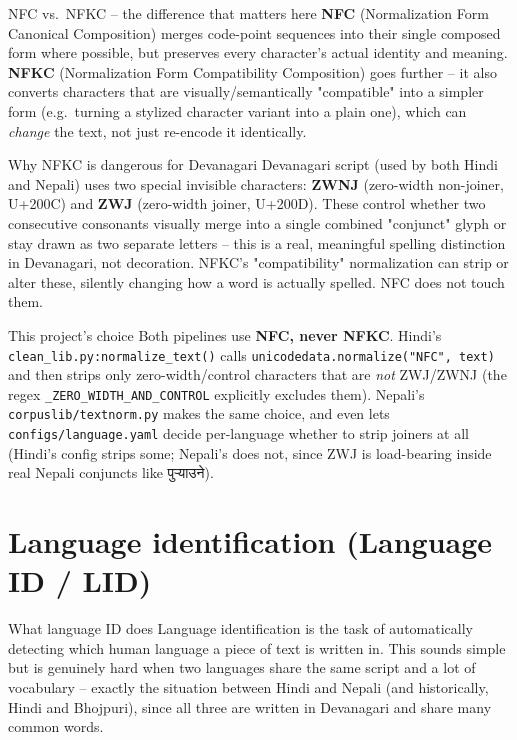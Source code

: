 \documentclass[11pt]{report}
\newcommand{\dn}[1]{{\devanagarifont #1}}
\begin{document}
\begin{concept}{NFC vs.\ NFKC -- the difference that matters here}
\textbf{NFC} (Normalization Form Canonical Composition) merges
code-point sequences into their single composed form where possible, but
preserves every character's actual identity and meaning.
\textbf{NFKC} (Normalization Form Compatibility Composition) goes
further -- it also converts characters that are visually/semantically
"compatible" into a simpler form (e.g.\ turning a stylized character
variant into a plain one), which can \textit{change} the text, not just
re-encode it identically.
\end{concept}

\begin{example}{Why NFKC is dangerous for Devanagari}
Devanagari script (used by both Hindi and Nepali) uses two special
invisible characters: \textbf{ZWNJ} (zero-width non-joiner, U+200C) and
\textbf{ZWJ} (zero-width joiner, U+200D). These control whether two
consecutive consonants visually merge into a single combined "conjunct"
glyph or stay drawn as two separate letters -- this is a real,
meaningful spelling distinction in Devanagari, not decoration. NFKC's
"compatibility" normalization can strip or alter these, silently changing
how a word is actually spelled. NFC does not touch them.
\end{example}

\begin{implementation}{This project's choice}
Both pipelines use \textbf{NFC, never NFKC}. Hindi's
\texttt{clean\_lib.py:normalize\_text()} calls
\texttt{unicodedata.normalize("NFC", text)} and then strips only
zero-width/control characters that are \textit{not} ZWJ/ZWNJ (the regex
\texttt{\_ZERO\_WIDTH\_AND\_CONTROL} explicitly excludes them). Nepali's
\texttt{corpuslib/textnorm.py} makes the same choice, and even lets
\texttt{configs/language.yaml} decide per-language whether to strip
joiners at all (Hindi's config strips some; Nepali's does not, since ZWJ
is load-bearing inside real Nepali conjuncts like
\dn{पुर्‍याउने}).
\end{implementation}

\section{Language identification (Language ID / LID)}
\label{sec:concept-langid}

\begin{concept}{What language ID does}
Language identification is the task of automatically detecting which
human language a piece of text is written in. This sounds simple but is
genuinely hard when two languages share the same script and a lot of
vocabulary -- exactly the situation between Hindi and Nepali (and
historically, Hindi and Bhojpuri), since all three are written in
Devanagari and share many common words.
\end{concept}
\end{document}
